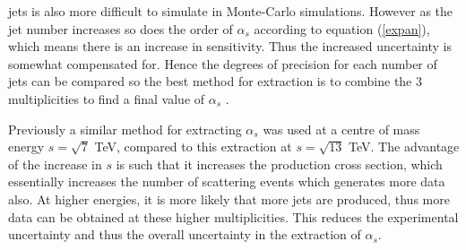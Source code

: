 \documentclass[12pt, onecolumn]{revtex4}    %
\begin{document}
jets is also more difficult to simulate in Monte-Carlo simulations. However as the jet number increases so does the order of ${\alpha_s}$ according to equation (\ref{expan}), which means there is an increase in sensitivity. Thus the increased uncertainty is somewhat compensated for. Hence the degrees of precision for each number of jets can be compared so the best method for extraction is to combine the 3 multiplicities to find a final value of ${\alpha _s}$ \cite{DMP}. 

Previously a similar method for extracting ${\alpha_s}$ was used at a centre of mass energy ${s = \sqrt{7}}$ TeV, compared to this extraction at ${s = \sqrt{13}}$ TeV. The advantage of the increase in ${s}$ is such that it increases the production cross section, which essentially increases the number of scattering events which generates more data also. At higher energies, it is more likely that more jets are produced, thus more data can be obtained at these higher multiplicities. This reduces the experimental uncertainty and thus the overall uncertainty in the extraction of ${\alpha_s}$. 
\end{document}
